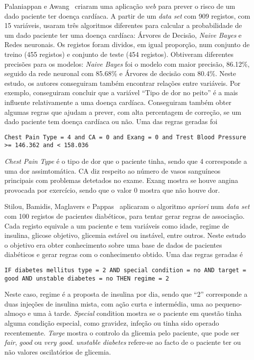 Palaniappan e Awang~\cite{sota2} criaram uma aplicação \textit{web} para prever o risco de um dado paciente ter doença cardíaca. A partir de um \textit{data set} com 909 registos, com 15 variáveis, usaram três algoritmos diferentes para calcular a probabilidade de um dado paciente ter uma doença cardíaca: Árvores de Decisão, \textit{Naive Bayes} e Redes neuronais. Os registos foram dividos, em igual proporção, num conjunto de treino (455 registos) e conjunto de teste (454 registos). Obtiveram diferentes precisões para os modelos: \textit{Naive Bayes} foi o modelo com maior precisão, 86.12\%, seguido da rede neuronal com 85.68\% e Árvores de decisão com 80.4\%. Neste estudo, os autores conseguiram também encontrar relações entre variáveis. Por exemplo, conseguiram concluir que a variável ``Tipo de dor no peito'' é a mais influente relativamente a uma doença cardíaca. Conseguiram também obter algumas regras que ajudam a prever, com alta percentagem de correção, se um dado paciente tem doença cardíaca ou não. Uma das regras geradas foi 

\begin{lstlisting}
Chest Pain Type = 4 and CA = 0 and Exang = 0 and Trest Blood Pressure >= 146.362 and < 158.036
\end{lstlisting}
\textit{Chest Pain Type} é o tipo de dor que o paciente tinha, sendo que 4 corresponde a uma dor assimtomática.
CA diz respeito ao número de vasos sanguíneos principais com problemas detetados no exame.
Exang mostra se houve angina provocada por exercício, sendo que o valor 0 mostra que não houve dor.


Stilou, Bamidis, Maglavers e Pappas~\cite{association} aplicaram o algoritmo \textit{apriori} num \textit{data set} com 100 registos de pacientes diabéticos, para tentar gerar regras de associação. Cada registo equivale a um paciente e tem variáveis como idade, regime de insulina, glicose objetivo, glicemia estável ou instável, entre outros. 
Neste estudo o objetivo era obter conhecimento sobre uma base de dados de pacientes diabéticos e gerar regras com o conhecimento obtido.
Uma das regras geradas é 
\begin{lstlisting}
IF diabetes mellitus type = 2 AND special condition = no AND target = good AND unstable diabetes = no THEN regime = 2
\end{lstlisting}
Neste caso, regime é a proposta de insulina por dia, sendo que ``2'' corresponde a duas injeções de insulina mista, com ação curta e intermédia, uma ao pequeno-almoço e uma à tarde. 
\textit{Special} condition mostra se o paciente em questão tinha alguma condição especial, como gravidez, infeção ou tinha sido operado recentemente.
\textit{Targe} mostra o controlo da glicemia pelo paciente, que pode ser \textit{fair}, \textit{good} ou \textit{very good}.
\textit{unstable diabetes} refere-se ao facto de o paciente ter ou não valores oscilatórios de glicemia.

